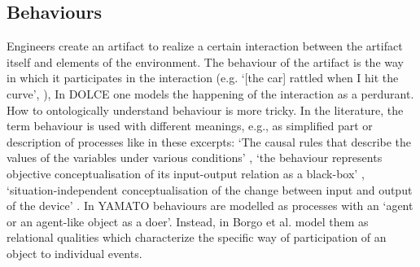 \documentclass[sw]{iosart2x}
\newcommand{\DOLCE}{\textsc{DOLCE}\xspace} %
\newcommand{\YAMATO}{\textsc{YAMATO}\xspace}
\newcommand{\quotes}[1]{`#1'}
\newcommand{\TODO}[1]{{\color{red} #1
}}
\begin{document}



\subsection{Behaviours}
Engineers create an artifact to realize a certain interaction between the artifact itself and elements of the environment. The behaviour of the artifact is the way in which it participates in the interaction (e.g. \quotes{[the car] rattled when I hit the curve}, \cite{chandrasekaranFunctionDeviceRepresentation2000}), 
In \DOLCE one models the happening of the interaction as a perdurant. How to ontologically understand behaviour is more tricky. 
In the literature, the term behaviour is used with different meanings, e.g., as simplified part or description of processes like in these excerpts: \quotes{The causal rules that describe the values of the variables under various conditions} \cite{chandrasekaranFunctionDeviceRepresentation2000}, \quotes{the behaviour represents objective conceptualisation of its input-output relation as a black-box} \cite{kitamuraOntologicalModelDevice2006}, \quotes{situation-independent conceptualisation of the change between input and output of the device} \cite{mizoguchiFunctionalOntologyArtifacts2009}. 
In \YAMATO \cite{Mizoguchi2017YAMATOYA} behaviours are modelled as processes with an \quotes{agent or an agent-like object as a doer}. 
Instead, in \cite{borgoFormalOntologicalPerspective2009} Borgo et al.  model them as relational qualities which characterize the specific way of participation of an object to individual events. 
\end{document}
